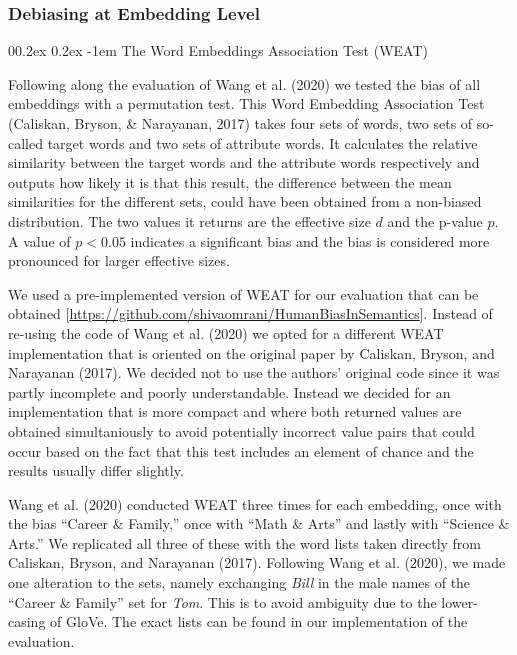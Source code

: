 \documentclass[
  english,
  man,floatsintext]{apa6}
\makeatletter
\let\oldparagraph\paragraph
\renewcommand{\paragraph}[1]{\oldparagraph{#1}\mbox{}}
\renewcommand{\paragraph}{\@startsection{paragraph}{4}{\parindent}%
  {0\baselineskip \@plus 0.2ex \@minus 0.2ex}%
  {-1em}%
  {\normalfont\normalsize\bfseries\itshape\typesectitle}}
\makeatother
\begin{document}
\hypertarget{debiasing-at-embedding-level}{%
\subsubsection{Debiasing at Embedding Level}\label{debiasing-at-embedding-level}}

\hypertarget{the-word-embeddings-association-test-weat}{%
\paragraph{The Word Embeddings Association Test (WEAT)}\label{the-word-embeddings-association-test-weat}}

Following along the evaluation of Wang et al. (2020) we tested the bias of all embeddings with a permutation test. This Word Embedding Association Test (Caliskan, Bryson, \& Narayanan, 2017) takes four sets of words, two sets of so-called target words and two sets of attribute words. It calculates the relative similarity between the target words and the attribute words respectively and outputs how likely it is that this result, the difference between the mean similarities for the different sets, could have been obtained from a non-biased distribution. The two values it returns are the effective size \(d\) and the p-value \(p\). A value of \(p<0.05\) indicates a significant bias and the bias is considered more pronounced for larger effective sizes.

We used a pre-implemented version of WEAT for our evaluation that can be obtained {[}\url{https://github.com/shivaomrani/HumanBiasInSemantics}{]}. Instead of re-using the code of Wang et al. (2020) we opted for a different WEAT implementation that is oriented on the original paper by Caliskan, Bryson, and Narayanan (2017). We decided not to use the authors' original code since it was partly incomplete and poorly understandable. Instead we decided for an implementation that is more compact and where both returned values are obtained simultaniously to avoid potentially incorrect value pairs that could occur based on the fact that this test includes an element of chance and the results usually differ slightly.

Wang et al. (2020) conducted WEAT three times for each embedding, once with the bias ``Career \& Family,'' once with ``Math \& Arts'' and lastly with ``Science \& Arts.'' We replicated all three of these with the word lists taken directly from Caliskan, Bryson, and Narayanan (2017). Following Wang et al. (2020), we made one alteration to the sets, namely exchanging \emph{Bill} in the male names of the ``Career \& Family'' set for \emph{Tom}. This is to avoid ambiguity due to the lower-casing of GloVe. The exact lists can be found in our implementation of the evaluation.
\end{document}
